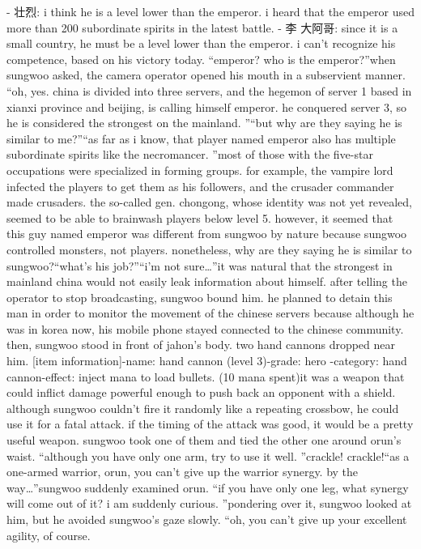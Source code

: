 - 壮烈: i think he is a level lower than the emperor.
 i heard that the emperor used more than 200 subordinate spirits in the latest battle.
- 李 大阿哥: since it is a small country, he must be a level lower than the emperor.
 i can’t recognize his competence, based on his victory today.
“emperor? who is the emperor?”when sungwoo asked, the camera operator opened his mouth in a subservient manner.
“oh, yes.
 china is divided into three servers, and the hegemon of server 1 based in xianxi province and beijing, is calling himself emperor.
 he conquered server 3, so he is considered the strongest on the mainland.
”“but why are they saying he is similar to me?”“as far as i know, that player named emperor also has multiple subordinate spirits like the necromancer.
”most of those with the five-star occupations were specialized in forming groups.
for example, the vampire lord infected the players to get them as his followers, and the crusader commander made crusaders.
 the so-called gen.
 chongong, whose identity was not yet revealed, seemed to be able to brainwash players below level 5.
however, it seemed that this guy named emperor was different from sungwoo by nature because sungwoo controlled monsters, not players.
 nonetheless, why are they saying he is similar to sungwoo?“what’s his job?”“i’m not sure…”it was natural that the strongest in mainland china would not easily leak information about himself.
after telling the operator to stop broadcasting, sungwoo bound him.
 he planned to detain this man in order to monitor the movement of the chinese servers because although he was in korea now, his mobile phone stayed connected to the chinese community.
then, sungwoo stood in front of jahon’s body.
 two hand cannons dropped near him.
[item information]-name: hand cannon (level 3)-grade: hero
-category: hand cannon-effect: inject mana to load bullets.
 (10 mana spent)it was a weapon that could inflict damage powerful enough to push back an opponent with a shield.
 although sungwoo couldn’t fire it randomly like a repeating crossbow, he could use it for a fatal attack.
 if the timing of the attack was good, it would be a pretty useful weapon.
sungwoo took one of them and tied the other one around orun’s waist.
“although you have only one arm, try to use it well.
”crackle! crackle!“as a one-armed warrior, orun, you can’t give up the warrior synergy.
 by the way…”sungwoo suddenly examined orun.
“if you have only one leg, what synergy will come out of it? i am suddenly curious.
”pondering over it, sungwoo looked at him, but he avoided sungwoo’s gaze slowly.
“oh, you can’t give up your excellent agility, of course.
